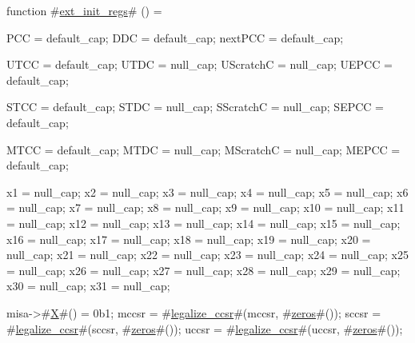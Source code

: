 function #\hyperref[sailRISCVzextzyinitzyregs]{ext\_init\_regs}# () = {
  PCC = default_cap;
  DDC = default_cap;
  nextPCC = default_cap;

  UTCC = default_cap;
  UTDC = null_cap;
  UScratchC = null_cap;
  UEPCC = default_cap;

  STCC = default_cap;
  STDC = null_cap;
  SScratchC = null_cap;
  SEPCC = default_cap;

  MTCC = default_cap;
  MTDC = null_cap;
  MScratchC = null_cap;
  MEPCC = default_cap;

  x1  = null_cap;
  x2  = null_cap;
  x3  = null_cap;
  x4  = null_cap;
  x5  = null_cap;
  x6  = null_cap;
  x7  = null_cap;
  x8  = null_cap;
  x9  = null_cap;
  x10 = null_cap;
  x11 = null_cap;
  x12 = null_cap;
  x13 = null_cap;
  x14 = null_cap;
  x15 = null_cap;
  x16 = null_cap;
  x17 = null_cap;
  x18 = null_cap;
  x19 = null_cap;
  x20 = null_cap;
  x21 = null_cap;
  x22 = null_cap;
  x23 = null_cap;
  x24 = null_cap;
  x25 = null_cap;
  x26 = null_cap;
  x27 = null_cap;
  x28 = null_cap;
  x29 = null_cap;
  x30 = null_cap;
  x31 = null_cap;

  misa->#\hyperref[sailRISCVzX]{X}#() = 0b1;
  mccsr = #\hyperref[sailRISCVzlegalizzezyccsr]{legalize\_ccsr}#(mccsr, #\hyperref[sailRISCVzzzeros]{zeros}#());
  sccsr = #\hyperref[sailRISCVzlegalizzezyccsr]{legalize\_ccsr}#(sccsr, #\hyperref[sailRISCVzzzeros]{zeros}#());
  uccsr = #\hyperref[sailRISCVzlegalizzezyccsr]{legalize\_ccsr}#(uccsr, #\hyperref[sailRISCVzzzeros]{zeros}#());
}
